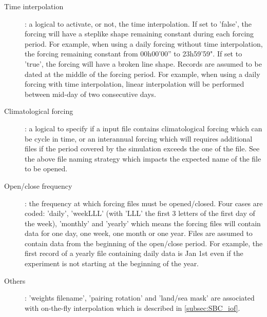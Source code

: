 \documentclass[../main/NEMO_manual]{subfiles}
\begin{document}
\begin{description}
\item [Time interpolation]: a logical to activate, or not, the time interpolation.
  If set to 'false', the forcing will have a steplike shape remaining constant during each forcing period.
  For example, when using a daily forcing without time interpolation, the forcing remaining constant from
  00h00'00'' to 23h59'59".
  If set to 'true', the forcing will have a broken line shape.
  Records are assumed to be dated at the middle of the forcing period.
  For example, when using a daily forcing with time interpolation,
  linear interpolation will be performed between mid-day of two consecutive days.
\item [Climatological forcing]: a logical to specify if a input file contains climatological forcing which can be cycle in time,
  or an interannual forcing which will requires additional files if
  the period covered by the simulation exceeds the one of the file.
  See the above file naming strategy which impacts the expected name of the file to be opened.
\item [Open/close frequency]: the frequency at which forcing files must be opened/closed.
  Four cases are coded:
  'daily', 'weekLLL' (with 'LLL' the first 3 letters of the first day of the week), 'monthly' and 'yearly' which
  means the forcing files will contain data for one day, one week, one month or one year.
  Files are assumed to contain data from the beginning of the open/close period.
  For example, the first record of a yearly file containing daily data is Jan 1st even if
  the experiment is not starting at the beginning of the year.
\item [Others]:  'weights filename', 'pairing rotation' and 'land/sea mask' are associated with
  on-the-fly interpolation which is described in \autoref{subsec:SBC_iof}.
\end{description}
\end{document}
